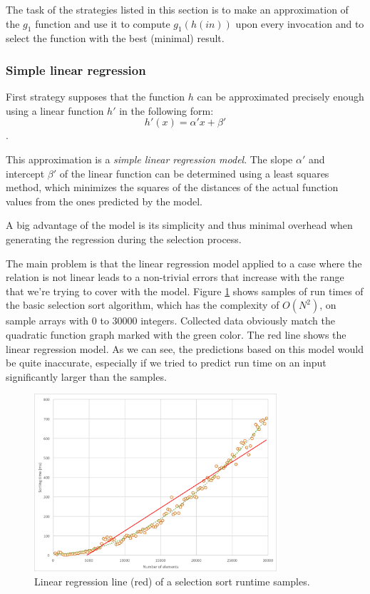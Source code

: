 The task of the strategies listed in this section is to make an approximation of the \(g_1\) function and use it to compute \(g_1(h(in))\) upon every invocation and to select the function with the best (minimal) result.

\subsubsection{Simple linear regression}

First strategy supposes that the function \(h\) can be approximated precisely enough using a linear function \(h'\) in the following form:
\[h'(x) = \alpha' x + \beta'\].

This approximation is a \textit{simple linear regression model}. The slope \(\alpha'\) and intercept \(\beta'\) of the linear function can be determined using a least squares method, which minimizes the squares of the distances of the actual function values from the ones predicted by the model.

A big advantage of the model is its simplicity and thus minimal overhead when generating the regression during the selection process. 

The main problem is that the linear regression model applied to a case where the relation is not linear leads to a non-trivial errors that increase with the range that we're trying to cover with the model. Figure \ref{fig:selection_sort_linear_trendline} shows samples of run times of the basic selection sort algorithm, which has the complexity of \(O(N^2)\), on sample arrays with 0 to 30000 integers. Collected data obviously match the quadratic function graph marked with the green color. The red line shows the linear regression model. As we can see, the predictions based on this model would be quite inaccurate, especially if we tried to predict run time on an input significantly larger than the samples.

\begin{figure}[h!]
	\centerline{\mbox{\includegraphics[width=90mm]{./img/selection_sort_linear_trendline.png}}}
	\caption{Linear regression line (red) of a selection sort runtime samples.}
	\label{fig:selection_sort_linear_trendline}
\end{figure}

